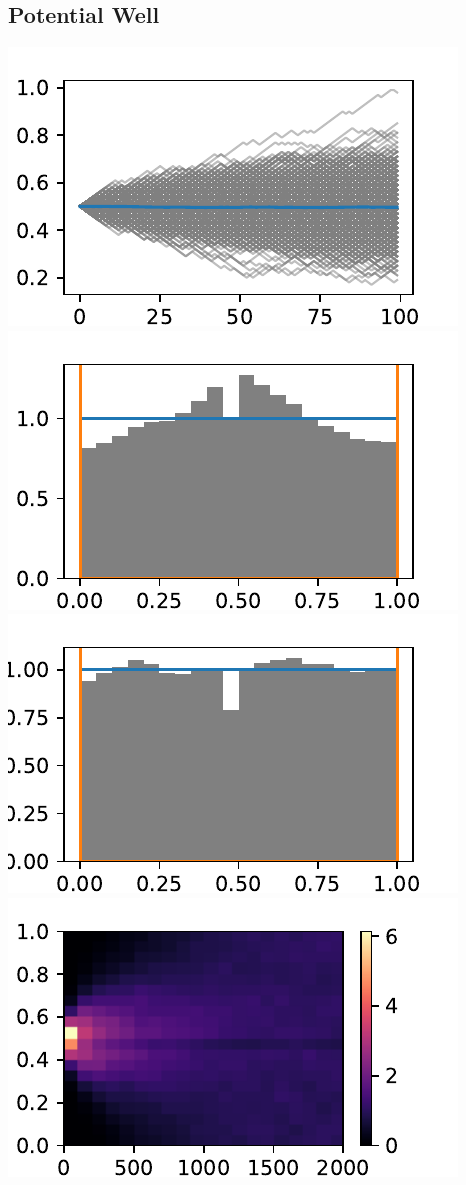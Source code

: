 \documentclass[
    parskip=half, 
    twoside=false,
    twocolumn=true,
    fontsize=11pt,
]{scrarticle}
\begin{document}
\subsection{Potential Well}
\includegraphics{figures/02 time evolution.pdf}
\includegraphics{figures/02 histogram.pdf}
\includegraphics{figures/02 histogram random start.pdf}
\includegraphics{figures/02 histogram evolution.pdf}
\end{document}
